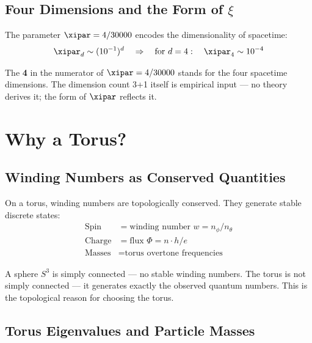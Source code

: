\subsection{Four Dimensions and the Form of \texorpdfstring{$\xi$}{xi}}

The parameter $\xipar = 4/30000$ encodes the dimensionality of spacetime:
\begin{equation}
	\xipar_d \sim (10^{-1})^d \quad \Rightarrow \quad \text{for } d=4: \quad \xipar_4 \sim 10^{-4}
\end{equation}

\begin{keyresult}
The \textbf{4} in the numerator of $\xipar = 4/30000$ stands for the four spacetime dimensions. The dimension count 3+1 itself is empirical input — no theory derives it; the form of $\xipar$ reflects it.
\end{keyresult}

\section{Why a Torus?}

\subsection{Winding Numbers as Conserved Quantities}

On a torus, winding numbers are topologically conserved. They generate stable discrete states:
\begin{align}
	\text{Spin} &= \text{winding number } w = n_\phi / n_\theta \\
	\text{Charge} &= \text{flux } \Phi = n \cdot h/e \\
	\text{Masses} &= \text{torus overtone frequencies}
\end{align}

\begin{keypoint}
A sphere $S^3$ is simply connected — no stable winding numbers. The torus is not simply connected — it generates exactly the observed quantum numbers. This is the topological reason for choosing the torus.
\end{keypoint}

\subsection{Torus Eigenvalues and Particle Masses}

